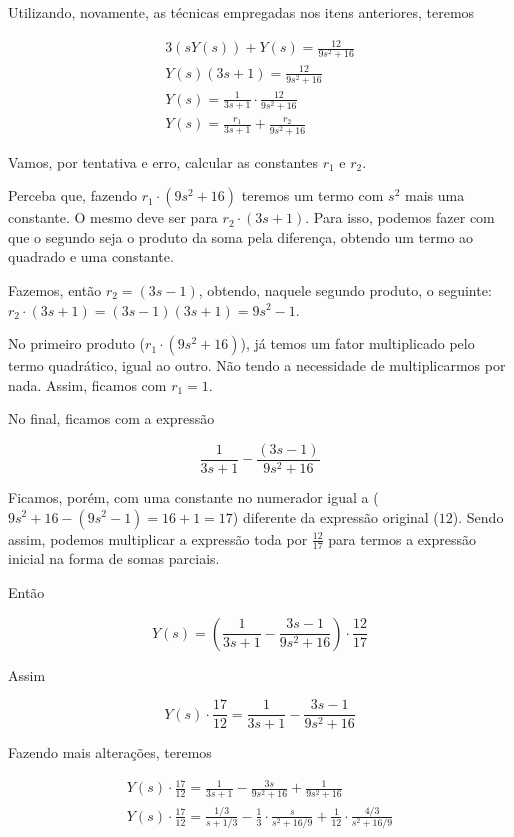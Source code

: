 \documentclass{article}
\begin{document}
Utilizando, novamente, as técnicas empregadas nos itens anteriores, teremos

\begin{align*}
    3(sY(s)) + Y(s) = \frac{12}{9s^2 + 16}\\
    Y(s)(3s + 1) = \frac{12}{9s^2 + 16}\\
    Y(s) = \frac{1}{3s + 1} \cdot \frac{12}{9s^2 + 16}\\
    Y(s) = \frac{r_1}{3s + 1} + \frac{r_2}{9s^2 + 16}
\end{align*}

Vamos, por tentativa e erro, calcular as constantes $r_1 \text{ e } r_2$.

Perceba que, fazendo $r_1 \cdot (9s^2 + 16)$ teremos um termo com $s^2$ mais uma constante. O mesmo deve ser para $r_2 \cdot (3s + 1)$. Para isso, podemos fazer com que o segundo seja o produto da soma pela diferença, obtendo um termo ao quadrado e uma constante.

Fazemos, então $r_2 = (3s - 1)$, obtendo, naquele segundo produto, o seguinte: $r_2 \cdot (3s + 1) = (3s - 1) (3s + 1) = 9s^2 - 1$.

No primeiro produto ($r_1 \cdot (9s^2 + 16)$), já temos um fator multiplicado pelo termo quadrático, igual ao outro. Não tendo a necessidade de multiplicarmos por nada. Assim, ficamos com $r_1 = 1$.

No final, ficamos com a expressão

\[\frac{1}{3s + 1} - \frac{(3s - 1)}{9s^2 + 16}\]

Ficamos, porém, com uma constante no numerador igual a ($9s^2 + 16 - (9s^2 - 1) = 16 + 1 = 17$) diferente da expressão original ($12$). Sendo assim, podemos multiplicar a expressão toda por $\frac{12}{17}$ para termos a expressão inicial na forma de somas parciais.

Então

\[Y(s) = \left(\frac{1}{3s + 1} - \frac{3s - 1}{9s^2 + 16}\right) \cdot \frac{12}{17}\]

Assim

\[Y(s) \cdot \frac{17}{12} = \frac{1}{3s + 1} - \frac{3s - 1}{9s^2 + 16}\]

Fazendo mais alterações, teremos

\begin{align*}
    Y(s) \cdot \frac{17}{12} = \frac{1}{3s + 1} - \frac{3s}{9s^2 + 16} + \frac{1}{9s^2 + 16}\\
    Y(s) \cdot \frac{17}{12} = \frac{1/3}{s + 1/3} - \frac{1}{3}\cdot\frac{s}{s^2 + 16/9} + \frac{1}{12}\cdot\frac{4/3}{s^2 + 16/9}
\end{align*}
\end{document}
